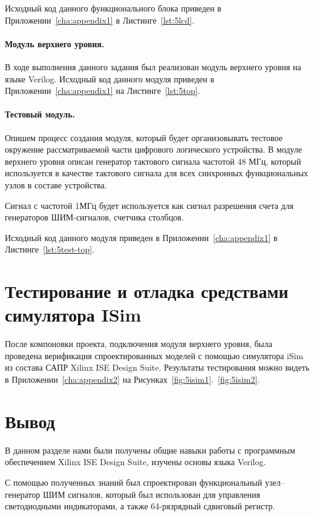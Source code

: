 Исходный код данного функционального блока приведен в Приложении~\ref{cha:appendix1} в Листинге~\ref{lst:5lcd}.

\paragraph{Модуль верхнего уровня.}
В ходе выполнения данного задания был реализован модуль верхнего уровня на языке Verilog.
Исходный код данного модуля приведен в Приложении~\ref{cha:appendix1} на Листинге~\ref{lst:5top}.

\paragraph{Тестовый модуль.}
Опишем процесс создания модуля, который будет организовывать тестовое окружение рассматриваемой части цифрового логического устройства. 
В модуле верхнего уровня описан генератор тактового сигнала частотой 48 МГц, который используется в качестве тактового сигнала для всех синхронных функциональных узлов в составе устройства. 

Сигнал с частотой 1МГц будет используется как сигнал разрешения счета для генераторов ШИМ-сигналов, счетчика столбцов.

Исходный код данного модуля приведен в Приложении~\ref{cha:appendix1} в Листинге~\ref{lst:5test-top}.


\section{Тестирование и отладка средствами симулятора ISim}
После компоновки проекта, подключения модуля верхнего уровня, была проведена верификация спроектированных моделей с помощью симулятора iSim из состава САПР Xilinx ISE Design Suite. Результаты тестирования можно видеть в Приложении~\ref{cha:appendix2} на Рисунках~\ref{fig:5isim1}.~\ref{fig:5isim2}.





\section{Вывод}

В данном разделе нами были получены общие навыки работы с программным обеспечением Xilinx ISE Design Suite, изучены основы языка Verilog.

С помощью полученных знаний был спроектирован функциональный узел--генератор ШИМ сигналов, который был использован для управления светодиодными индикаторами, а также 64-рязрядный сдвиговый регистр.


